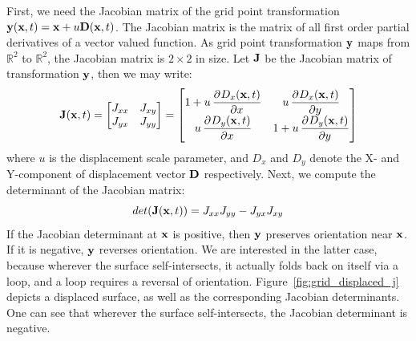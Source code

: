 %
First, we need the Jacobian matrix of the grid point transformation 
$\mathbf{y}(\mathbf{x},t)=\mathbf{x}+u\mathbf{D}(\mathbf{x},t)$. The Jacobian matrix is 
the matrix of all first order partial derivatives of a vector valued function. 
As grid point transformation $\mathbf{y}$ maps from $\mathbb{R}^2$ to 
$\mathbb{R}^2$, the Jacobian matrix is $2\times 2$ in size. Let $\mathbf{J}$ be 
the Jacobian matrix of transformation $\mathbf{y}$, then we may write:
%
\begin{equation}
 \mvec{J}(\mvec{x},t) =
 \begin{bmatrix}
 J_{xx} & J_{xy} \\
 J_{yx} & J_{yy}
 \end{bmatrix}
 =
 \begin{bmatrix}
   1 + u\dpd{D_x(\mvec{x},t)}{x} & u\dpd{D_x(\mvec{x},t)}{y} \\
   u\dpd{D_y(\mvec{x},t)}{x} & 1 + u\dpd{D_y(\mvec{x},t)}{y}
 \end{bmatrix}
\end{equation}
where $u$ is the displacement scale parameter, and $D_x$ and $D_y$ denote the X-
and Y-component of displacement vector $\mathbf{D}$ respectively.
Next, we compute the determinant of the Jacobian matrix:
\begin{equation}
 det(\mathbf{J}(\mathbf{x},t)) = J_{xx}J_{yy}-J_{yx}J_{xy}
\end{equation}
%
If the Jacobian determinant at $\mathbf{x}$ is positive, then $\mathbf{y}$ 
preserves orientation near $\mathbf{x}$. If it is negative, $\mathbf{y}$ reverses 
orientation. We are interested in the latter case, because wherever the 
surface self-intersects, it actually folds back on itself via a loop, and a 
loop requires a reversal of orientation. Figure~\ref{fig:grid_displaced_j} 
depicts a displaced surface, as well as the corresponding Jacobian 
determinants. One can see that wherever the surface self-intersects, the 
Jacobian determinant is negative.


